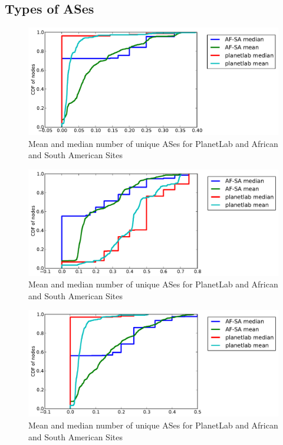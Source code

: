 \documentclass{sig-alternate-10pt}
\begin{document}
\subsection{Types of ASes}

\begin{figure}
\centering
    \includegraphics[width=1.0\linewidth]{figs/fractions_of_types-ltp.pdf}
    \caption{Mean and median number of unique ASes for PlanetLab and African
and South American Sites}
\end{figure}

\begin{figure}
\centering
    \includegraphics[width=1.0\linewidth]{figs/fractions_of_types-stp.pdf}
    \caption{Mean and median number of unique ASes for PlanetLab and African
and South American Sites}
\end{figure}

\begin{figure}
\centering
    \includegraphics[width=1.0\linewidth]{figs/fractions_of_types-tier1.pdf}
    \caption{Mean and median number of unique ASes for PlanetLab and African
and South American Sites}
\end{figure}
\end{document}
